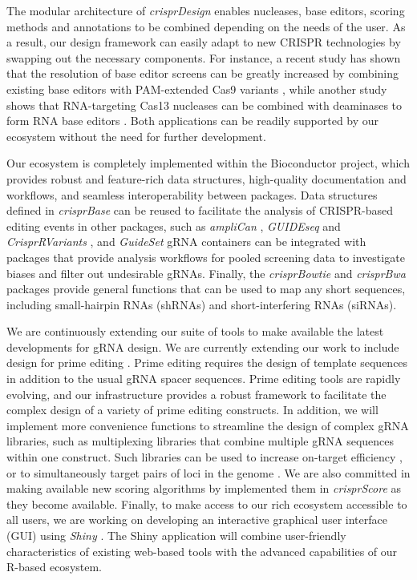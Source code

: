 \documentclass[pdftex,english,10pt]{article}
\begin{document}
The modular architecture of \textit{crisprDesign} enables nucleases, base editors, scoring methods and annotations to be combined depending on the needs of the user. As a result, our design framework can easily adapt to new CRISPR technologies by swapping out the necessary components. For instance, a recent study has shown that the resolution of base editor screens can be greatly increased by combining existing base editors with PAM-extended Cas9 variants \citep{sangree2021benchmarking}, while another study shows that RNA-targeting Cas13 nucleases can be combined with deaminases to form RNA base editors \citep{rnaediting1}. Both applications can be readily supported by our ecosystem without the need for further development. 


Our ecosystem is completely implemented within the Bioconductor project, which provides robust and feature-rich data structures, high-quality documentation and workflows, and seamless interoperability between packages. Data structures defined in \textit{crisprBase} can be reused to facilitate the analysis of CRISPR-based editing events in other packages, such as \textit{ampliCan} \citep{labun2019accurate}, 
\textit{GUIDEseq} \citep{zhu2017guideseq} and \textit{CrisprRVariants} \citep{lindsay2016crisprvariants}, and \textit{GuideSet} gRNA containers can be integrated with packages that provide analysis workflows for pooled screening data  \citep{wang2019integrative, imkeller2020gscreend, gcrisprtools} to investigate biases and filter out undesirable gRNAs. Finally, the \textit{crisprBowtie} and \textit{crisprBwa} packages provide general functions that can be used to map any short sequences, including small-hairpin RNAs (shRNAs) and short-interfering RNAs (siRNAs). 
 
 
 

We are continuously extending our suite of tools to make available the latest developments for gRNA design. 
We are currently extending our work to include design for prime editing \citep{primeediting}. Prime editing requires the design of template sequences in addition to the usual gRNA spacer sequences.  Prime editing tools are rapidly evolving, and our infrastructure provides a robust framework to facilitate the complex design of a variety of prime editing constructs. In addition, we will implement more convenience functions to streamline the design of complex gRNA libraries, such as multiplexing libraries that combine multiple gRNA sequences within one construct. Such libraries can be used to increase on-target efficiency \citep{replogle2020combinatorial}, or to simultaneously target pairs of loci in the genome \citep{han2017synergistic}. We are also committed in making available new scoring algorithms by implemented them in \textit{crisprScore} as they become available. Finally, to make access to our rich ecosystem accessible to all users, we are working on developing an interactive graphical user interface (GUI) using \textit{Shiny} \citep{shiny}. The Shiny application will combine user-friendly characteristics of existing web-based tools with the advanced capabilities of our R-based ecosystem. 
\end{document}
